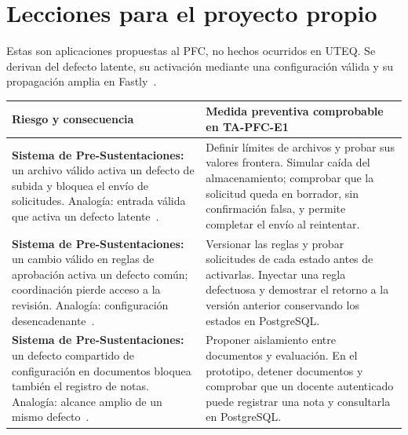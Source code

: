 \section*{Lecciones para el proyecto propio}
Estas son aplicaciones propuestas al PFC, no hechos ocurridos en UTEQ. Se derivan del defecto latente, su activación mediante una configuración válida y su propagación amplia en Fastly~\cite{fastly2021}.

\begingroup
\small
\renewcommand{\arraystretch}{1.15}
\begin{tabularx}{\linewidth}{@{}YY@{}}
\toprule
Riesgo y consecuencia & Medida preventiva comprobable en TA-PFC-E1 \\
\midrule
\textbf{Sistema de Pre-Sustentaciones:} un archivo válido activa un defecto de subida y bloquea el envío de solicitudes. Analogía: entrada válida que activa un defecto latente~\cite{fastly2021}.
& Definir límites de archivos y probar sus valores frontera. Simular caída del almacenamiento; comprobar que la solicitud queda en borrador, sin confirmación falsa, y permite completar el envío al reintentar. \\
\addlinespace
\textbf{Sistema de Pre-Sustentaciones:} un cambio válido en reglas de aprobación activa un defecto común; coordinación pierde acceso a la revisión. Analogía: configuración desencadenante~\cite{fastly2021}.
& Versionar las reglas y probar solicitudes de cada estado antes de activarlas. Inyectar una regla defectuosa y demostrar el retorno a la versión anterior conservando los estados en PostgreSQL. \\
\addlinespace
\textbf{Sistema de Pre-Sustentaciones:} un defecto compartido de configuración en documentos bloquea también el registro de notas. Analogía: alcance amplio de un mismo defecto~\cite{fastly2021}.
& Proponer aislamiento entre documentos y evaluación. En el prototipo, detener documentos y comprobar que un docente autenticado puede registrar una nota y consultarla en PostgreSQL. \\
\bottomrule
\end{tabularx}
\endgroup
